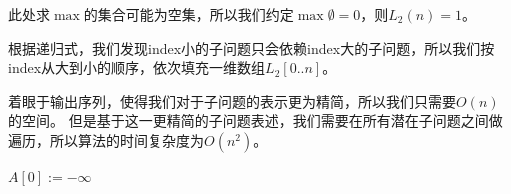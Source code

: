 \noindent 此处求$\max$的集合可能为空集，所以我们约定$\max\emptyset = 0$，则$L_2(n) = 1$。

根据递归式，我们发现index小的子问题只会依赖index大的子问题，所以我们按index从大到小的顺序，依次填充一维数组$L_2[0..n]$。

着眼于输出序列，使得我们对于子问题的表示更为精简，所以我们只需要$O(n)$的空间。
但是基于这一更精简的子问题表述，我们需要在所有潜在子问题之间做遍历，所以算法的时间复杂度为$O(n^2)$。


\begin{algorithm}[ht]
    
    \caption{LIS2($A[1..n]$) \label{A:LIS2} }
    
    $A[0] := -\infty$ \;
    
    
     \;
    
\end{algorithm}

\fi


\bla